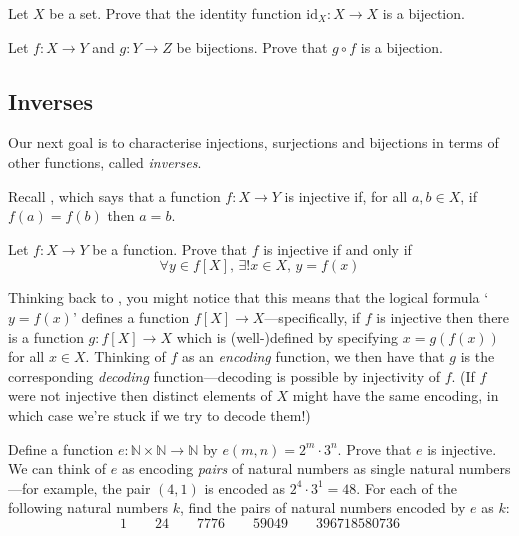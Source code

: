 \begin{exercise}
\label{exIdentityBijection}
Let $X$ be a set. Prove that the identity function $\mathrm{id}_X : X \to X$ is a bijection.
\end{exercise}

\begin{exercise}
\label{exCompositeOfBijectionsIsBijection}
Let $f : X \to Y$ and $g : Y \to Z$ be bijections. Prove that $g \circ f$ is a bijection.
\end{exercise}

\subsection*{Inverses}

Our next goal is to characterise injections, surjections and bijections in terms of other functions, called \textit{inverses}.

Recall , which says that a function $f : X \to Y$ is injective if, for all $a,b \in X$, if $f(a)=f(b)$ then $a=b$.

\begin{exercise}
Let $f : X \to Y$ be a function. Prove that $f$ is injective if and only if
\[ \forall y \in f[X],\, \exists ! x \in X,\, y=f(x) \]
\end{exercise}

Thinking back to , you might notice that this means that the logical formula `$y=f(x)$' defines a function $f[X] \to X$---specifically, if $f$ is injective then there is a function $g : f[X] \to X$ which is (well-)defined by specifying $x=g(f(x))$ for all $x \in X$. Thinking of $f$ as an \textit{encoding} function, we then have that $g$ is the corresponding \textit{decoding} function---decoding is possible by injectivity of $f$. (If $f$ were not injective then distinct elements of $X$ might have the same encoding, in which case we're stuck if we try to decode them!)

\begin{exercise}
\label{exEncodingPairs}
Define a function $e : \mathbb{N} \times \mathbb{N} \to \mathbb{N}$ by $e(m,n) = 2^m \cdot 3^n$. Prove that $e$ is injective. We can think of $e$ as encoding \textit{pairs} of natural numbers as single natural numbers---for example, the pair $(4,1)$ is encoded as $2^4 \cdot 3^1 = 48$. For each of the following natural numbers $k$, find the pairs of natural numbers encoded by $e$ as $k$:
\[ 1 \qquad 24 \qquad 7776 \qquad 59049 \qquad 396718580736 \]
\end{exercise}

